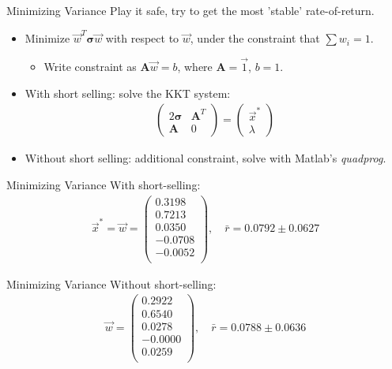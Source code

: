 \documentclass{beamer}
\numberwithin{equation}{section}
\newcommand{\mb}{\mathbf}
\begin{document}
\begin{frame}{Minimizing Variance}
  Play it safe, try to get the most 'stable' rate-of-return.
  \begin{itemize}
    \item{Minimize $\vec w^T \boldsymbol{\sigma} \vec w$ with respect to $\vec w$, under the constraint that $\sum w_i = 1$.}
    \begin{itemize}
      \item{Write constraint as ${\mb A}\vec w = b$, where ${\mb A} = \vec 1$, $b = 1$.}
    \end{itemize}
    \item{With short selling: solve the KKT system:
    \begin{align*}
      \begin{pmatrix}
        2\boldsymbol{\sigma} & \mb{A}^T\\
        \mb{A} & 0
      \end{pmatrix}
      =
      \begin{pmatrix}
        \vec x^*\\
        \lambda
      \end{pmatrix}
    \end{align*}
    }
    \item{Without short selling: additional constraint, solve with Matlab's {\em quadprog}.}
  \end{itemize}
\end{frame}

\begin{frame}{Minimizing Variance}
  With short-selling:
  \begin{align*}
    \vec x^* = \vec w = \begin{pmatrix}
    0.3198\\
    0.7213\\
    0.0350\\
    -0.0708\\
    -0.0052\\
    \end{pmatrix},\quad \bar r = 0.0792 \pm 0.0627
  \end{align*}
\end{frame}

\begin{frame}{Minimizing Variance}
  Without short-selling:
  \begin{align*}
    \vec w = \begin{pmatrix}
    0.2922\\
  0.6540\\
  0.0278\\
 -0.0000\\
  0.0259\\
    \end{pmatrix},\quad \bar r = 0.0788 \pm 0.0636
  \end{align*}
\end{frame}
\end{document}
